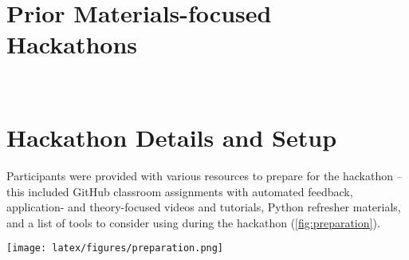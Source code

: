 \documentclass[superscriptaddress, nofootinbib,  amsmath, amssymb, twocolumn]{revtex4-2} %
\let\originalcite\cite
\renewcommand{\cite}[1]{\unskip~\originalcite{#1}}
\begin{document}


\section{Prior Materials-focused Hackathons}

\cite{jablonka_14_2023, l.ferguson_conference_2019, mulholland_hackathon_2015, sparks_insights_2024}

\section{Hackathon Details and Setup}

Participants were provided with various resources to prepare for the hackathon – this included GitHub classroom assignments with automated feedback, application- and theory-focused videos and tutorials, Python refresher materials, and a list of tools to consider using during the hackathon (\cref{fig:preparation}).

\begin{figure*}
    \centering
    \texttt{[image: latex/figures/preparation.png]}
    \caption{A snapshot of \href{https://ac-bo-hackathon.github.io/resources/}{resources listed on the hackathon webpage} such as hackathon orientation, intro to \gls{bo}, and a Python refresher assignment. These resources prepared participants to maximize their time during the two-day synchronous portion of the hackathon and helped level the playing field for participants with varied backgrounds and skill levels.}
    \label{fig:preparation}
\end{figure*}
\end{document}
